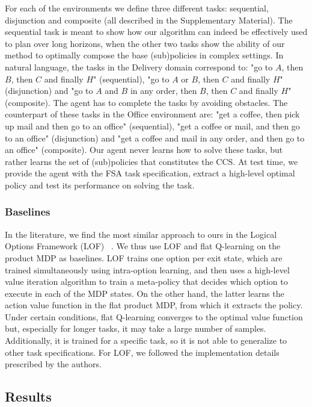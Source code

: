 For each of the environments we define three different tasks: sequential, disjunction and composite (all described in the Supplementary Material). The sequential task is meant to show how our algorithm can indeed be effectively used to plan over long horizons, when the other two tasks show the ability of our method to optimally compose the base (sub)policies in complex settings. In natural language, the tasks in the Delivery domain correspond to: "go to $A$, then $B$, then $C$ and finally $H$"  (sequential), "go to $A$ or $B$, then $C$ and finally $H$" (disjunction) and "go to $A$ and $B$ in any order, then $B$, then $C$ and finally $H$" (composite). The agent has to complete the tasks by avoiding obstacles. The counterpart of these tasks in the Office environment are: "get a coffee, then pick up mail and then go to an office" (sequential), "get a coffee or mail, and then go to an office" (disjunction) and "get a coffee and mail in any order, and then go to an office" (composite). 
Our agent never learns how to solve these tasks, but rather learns the set of (sub)policies that constitutes the CCS. At test time, we provide the agent with the FSA task specification, extract a high-level optimal policy and test its performance on solving the task.

\subsubsection{Baselines} In the literature, we find the most similar approach to ours in the Logical Options Framework (LOF) ~\citep{Araki2021}. We thus use LOF and flat Q-learning on the product MDP as baselines. LOF trains one option per exit state, which are trained simultaneously using intra-option learning, and then uses a high-level value iteration algorithm to train a meta-policy that decides which option to execute in each of the MDP states. On the other hand, the latter learns the action value function in the flat product MDP, from which it extracts the policy. Under certain conditions, flat Q-learning converges to the optimal value function but, especially for longer tasks, it may take a large number of samples. Additionally, it is trained for a specific task, so it is not able to generalize to other task specifications. For LOF, we followed the implementation details prescribed by the authors. 

\subsection{Results}

